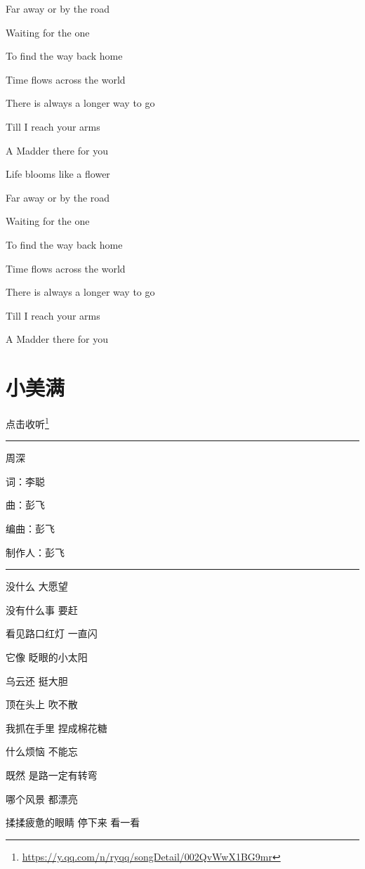 \documentclass[]{ctexbook}
\renewcommand{\href}[2]{#2\footnote{\url{#1}}}
\begin{document}
Far away or by the road

Waiting for the one

To find the way back home

Time flows across the world

There is always a longer way to go

Till I reach your arms

A Madder there for you

Life blooms like a flower

Far away or by the road

Waiting for the one

To find the way back home

Time flows across the world

There is always a longer way to go

Till I reach your arms

A Madder there for you

\section*{小美满}\label{happy-ending}


\href{https://y.qq.com/n/ryqq/songDetail/002QvWwX1BG9mr}{点击收听}

\begin{center}\rule{0.5\linewidth}{0.5pt}\end{center}

周深

词：李聪

曲：彭飞

编曲：彭飞

制作人：彭飞

\begin{center}\rule{0.5\linewidth}{0.5pt}\end{center}

没什么 大愿望

没有什么事 要赶

看见路口红灯 一直闪

它像 眨眼的小太阳

乌云还 挺大胆

顶在头上 吹不散

我抓在手里 捏成棉花糖

什么烦恼 不能忘

既然 是路一定有转弯

哪个风景 都漂亮

揉揉疲惫的眼睛 停下来 看一看
\end{document}
